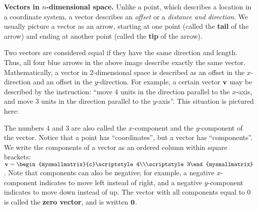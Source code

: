 \noindent\textbf{Vectors in $n$-dimensional space.}
Unlike a point, which describes a location in a coordinate system, a
vector describes an {\em
  offset} or a {\em distance and direction}. We usually
picture a vector as an arrow, starting at one point (called the
\textbf{tail} of the arrow) and ending
at another point
(called the \textbf{tip} of the arrow).
\begin{center}
\end{center}
Two vectors are considered equal if they have the same direction and
length. Thus, all four blue arrows in the above image describe exactly
the same vector. Mathematically, a vector in $2$-dimensional space is
described as an offset in the $x$-direction and an offset in the
$y$-direction.  For example, a certain vector $\vect{v}$ may be
described by the instruction: ``move $4$ units in the direction
parallel to the $x$-axis, and move $3$ units in the direction parallel
to the $y$-axis''. This situation is pictured here:
\begin{center}
\end{center}
The numbers $4$ and $3$ are also called the
$x$-component and the $y$-component of
the vector. Notice that a point has ``coordinates'', but a vector has
``components''. We write the components of a vector as an ordered
column within square brackets:
$\vect{v}=\begin{mysmallmatrix}{c}\scriptstyle4\\\scriptstyle3\end{mysmallmatrix}$. Note
that components can also be negative; for example, a negative
$x$-component indicates to move left instead of right, and a negative
$y$-component indicates to move down instead of up. The vector with
all components equal to $0$ is called the \textbf{zero
  vector}, and is written $\vect{0}$.

